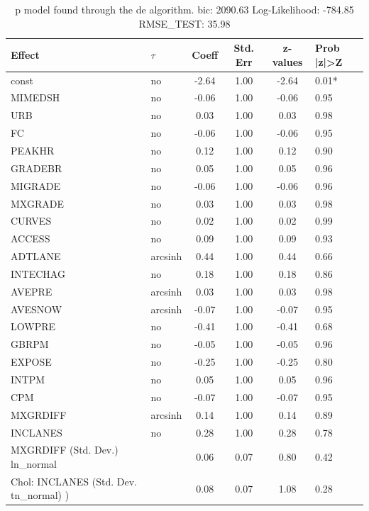 \begin{table}
	\caption{p model found through the de algorithm. bic: 2090.63 Log-Likelihood: -784.85 RMSE_TEST: 35.98}
	\begin{center}
		\begin{tabular}{|l|l|c|c|c|l|}
			\hline
			Effect & $\tau$ & Coeff & Std. Err & z-values & Prob |z|>Z \\
			\hline
			const & no & -2.64 & 1.00 & -2.64 & 0.01* \\
			\hline
			MIMEDSH & no & -0.06 & 1.00 & -0.06 & 0.95 \\
			\hline
			URB & no & 0.03 & 1.00 & 0.03 & 0.98 \\
			\hline
			FC & no & -0.06 & 1.00 & -0.06 & 0.95 \\
			\hline
			PEAKHR & no & 0.12 & 1.00 & 0.12 & 0.90 \\
			\hline
			GRADEBR & no & 0.05 & 1.00 & 0.05 & 0.96 \\
			\hline
			MIGRADE & no & -0.06 & 1.00 & -0.06 & 0.96 \\
			\hline
			MXGRADE & no & 0.03 & 1.00 & 0.03 & 0.98 \\
			\hline
			CURVES & no & 0.02 & 1.00 & 0.02 & 0.99 \\
			\hline
			ACCESS & no & 0.09 & 1.00 & 0.09 & 0.93 \\
			\hline
			ADTLANE & arcsinh & 0.44 & 1.00 & 0.44 & 0.66 \\
			\hline
			INTECHAG & no & 0.18 & 1.00 & 0.18 & 0.86 \\
			\hline
			AVEPRE & arcsinh & 0.03 & 1.00 & 0.03 & 0.98 \\
			\hline
			AVESNOW & arcsinh & -0.07 & 1.00 & -0.07 & 0.95 \\
			\hline
			LOWPRE & no & -0.41 & 1.00 & -0.41 & 0.68 \\
			\hline
			GBRPM & no & -0.05 & 1.00 & -0.05 & 0.96 \\
			\hline
			EXPOSE & no & -0.25 & 1.00 & -0.25 & 0.80 \\
			\hline
			INTPM & no & 0.05 & 1.00 & 0.05 & 0.96 \\
			\hline
			CPM & no & -0.07 & 1.00 & -0.07 & 0.95 \\
			\hline
			MXGRDIFF & arcsinh & 0.14 & 1.00 & 0.14 & 0.89 \\
			\hline
			INCLANES & no & 0.28 & 1.00 & 0.28 & 0.78 \\
			\hline
			MXGRDIFF (Std. Dev.) ln_normal &  & 0.06 & 0.07 & 0.80 & 0.42 \\
			\hline
			 Chol: INCLANES (Std. Dev. tn_normal) ) &  & 0.08 & 0.07 & 1.08 & 0.28 \\
			\hline
		\end{tabular}
	\end{center}
\end{table}